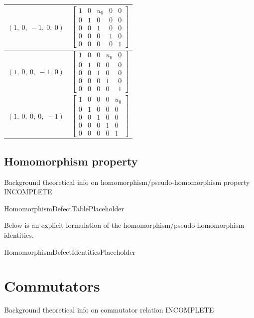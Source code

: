 \documentclass[11pt]{article}
\newcommand{\noi}{\noindent}
\theoremstyle{definition}
\begin{document}
\begin{tabular}{|l|c|}
    \hline
    $\left( 1, \  0, \  -1, \  0, \  0\right)$ & $\left[\begin{matrix}1 & 0 & u_{0} & 0 & 0\\0 & 1 & 0 & 0 & 0\\0 & 0 & 1 & 0 & 0\\0 & 0 & 0 & 1 & 0\\0 & 0 & 0 & 0 & 1\end{matrix}\right]$ \\
    \hline
    $\left( 1, \  0, \  0, \  -1, \  0\right)$ & $\left[\begin{matrix}1 & 0 & 0 & u_{0} & 0\\0 & 1 & 0 & 0 & 0\\0 & 0 & 1 & 0 & 0\\0 & 0 & 0 & 1 & 0\\0 & 0 & 0 & 0 & 1\end{matrix}\right]$ \\
    \hline
    $\left( 1, \  0, \  0, \  0, \  -1\right)$ & $\left[\begin{matrix}1 & 0 & 0 & 0 & u_{0}\\0 & 1 & 0 & 0 & 0\\0 & 0 & 1 & 0 & 0\\0 & 0 & 0 & 1 & 0\\0 & 0 & 0 & 0 & 1\end{matrix}\right]$ \\
    \hline
\end{tabular}


\subsection{Homomorphism property}

\noi Background theoretical info on homomorphism/pseudo-homomorphism property INCOMPLETE

\bigskip

HomomorphismDefectTablePlaceholder

\noi Below is an explicit formulation of the homomorphism/pseudo-homomorphism identities.

\bigskip

HomomorphismDefectIdentitiesPlaceholder

\newpage
\section{Commutators}

\noi Background theoretical info on commutator relation INCOMPLETE
\end{document}
